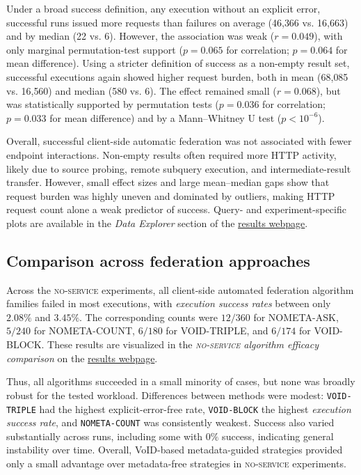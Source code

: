 \documentclass[runningheads]{llncs}
\begin{document}
Under a broad success definition, any execution without an explicit error, successful runs issued more requests than failures on average (46{,}366 vs. 16{,}663) and by median (22 vs. 6). 
However, the association was weak ($r=0.049$), with only marginal permutation-test support ($p=0.065$ for correlation; $p=0.064$ for mean difference).
Using a stricter definition of success as a non-empty result set, successful executions again showed higher request burden, both in mean (68{,}085 vs. 16{,}560) and median (580 vs. 6). 
The effect remained small ($r=0.068$), but was statistically supported by permutation tests ($p=0.036$ for correlation; $p=0.033$ for mean difference) and by a Mann--Whitney U test ($p<10^{-6}$).

Overall, successful client-side automatic federation was not associated with fewer endpoint interactions. 
Non-empty results often required more HTTP activity, likely due to source probing, remote subquery execution, and intermediate-result transfer. 
However, small effect sizes and large mean--median gaps show that request burden was highly uneven and dominated by outliers, making HTTP request count alone a weak predictor of success. 
Query- and experiment-specific plots are available in the \textit{Data Explorer} section of the \href{https://ecrum19.github.io/fed-survey-results/}{results webpage}.


\subsection{Comparison across federation approaches}\label{sec5.4}
Across the \textsc{no-service} experiments, all client-side automated federation algorithm families failed in most executions, with \emph{execution success rates} between only \(2.08\%\) and \(3.45\%\).
The corresponding counts were \(12/360\) for \textsc{NOMETA-ASK}, \(5/240\) for \textsc{NOMETA-COUNT}, \(6/180\) for \textsc{VOID-TRIPLE}, and \(6/174\) for \textsc{VOID-BLOCK}.
These results are visualized in the \textit{\textsc{no-service} algorithm efficacy comparison} on the \href{https://ecrum19.github.io/fed-survey-results/}{results webpage}.

Thus, all algorithms succeeded in a small minority of cases, but none was broadly robust for the tested workload. 
Differences between methods were modest: \texttt{VOID-TRIPLE} had the highest explicit-error-free rate, \texttt{VOID-BLOCK} the highest \emph{execution success rate}, and \texttt{NOMETA-COUNT} was consistently weakest. 
Success also varied substantially across runs, including some with \(0\%\) success, indicating general instability over time. 
Overall, VoID-based metadata-guided strategies provided only a small advantage over metadata-free strategies in \textsc{no-service} experiments.
\end{document}
